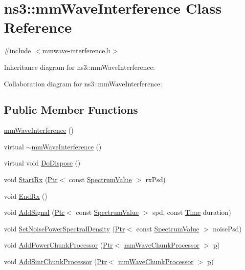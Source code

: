 \hypertarget{classns3_1_1mmWaveInterference}{}\section{ns3\+:\+:mm\+Wave\+Interference Class Reference}
\label{classns3_1_1mmWaveInterference}


{\ttfamily \#include $<$mmwave-\/interference.\+h$>$}



Inheritance diagram for ns3\+:\+:mm\+Wave\+Interference\+:


Collaboration diagram for ns3\+:\+:mm\+Wave\+Interference\+:
\subsection*{Public Member Functions}
\begin{DoxyCompactItemize}
\item 
\hyperlink{classns3_1_1mmWaveInterference_a26c5d244b8676bc44b70250ad1f35b16}{mm\+Wave\+Interference} ()
\item 
virtual \hyperlink{classns3_1_1mmWaveInterference_aaf731b487a954a570910ed99b317e78c}{$\sim$mm\+Wave\+Interference} ()
\item 
virtual void \hyperlink{classns3_1_1mmWaveInterference_ac1976038ac8fdf6353e487b71aedf65e}{Do\+Dispose} ()
\item 
void \hyperlink{classns3_1_1mmWaveInterference_ab12e116581090e640ee37ffd79935eba}{Start\+Rx} (\hyperlink{classns3_1_1Ptr}{Ptr}$<$ const \hyperlink{classns3_1_1SpectrumValue}{Spectrum\+Value} $>$ rx\+Psd)
\item 
void \hyperlink{classns3_1_1mmWaveInterference_ab3455acc16be249aba17f2d17e6abc73}{End\+Rx} ()
\item 
void \hyperlink{classns3_1_1mmWaveInterference_ad6103a4038057b5928489d68ffd80b95}{Add\+Signal} (\hyperlink{classns3_1_1Ptr}{Ptr}$<$ const \hyperlink{classns3_1_1SpectrumValue}{Spectrum\+Value} $>$ spd, const \hyperlink{classns3_1_1Time}{Time} duration)
\item 
void \hyperlink{classns3_1_1mmWaveInterference_a9b53eb717145246d3a67b8cca1d99020}{Set\+Noise\+Power\+Spectral\+Density} (\hyperlink{classns3_1_1Ptr}{Ptr}$<$ const \hyperlink{classns3_1_1SpectrumValue}{Spectrum\+Value} $>$ noise\+Psd)
\item 
void \hyperlink{classns3_1_1mmWaveInterference_a332e25564200ec5aa722d71423f9b6fe}{Add\+Power\+Chunk\+Processor} (\hyperlink{classns3_1_1Ptr}{Ptr}$<$ \hyperlink{classns3_1_1mmWaveChunkProcessor}{mm\+Wave\+Chunk\+Processor} $>$ \hyperlink{lte__link__budget__x2__handover__measures_8m_ac9de518908a968428863f829398a4e62}{p})
\item 
void \hyperlink{classns3_1_1mmWaveInterference_a1a4434e66afed95efb9e32880fbc48d0}{Add\+Sinr\+Chunk\+Processor} (\hyperlink{classns3_1_1Ptr}{Ptr}$<$ \hyperlink{classns3_1_1mmWaveChunkProcessor}{mm\+Wave\+Chunk\+Processor} $>$ \hyperlink{lte__link__budget__x2__handover__measures_8m_ac9de518908a968428863f829398a4e62}{p})
\end{DoxyCompactItemize}
